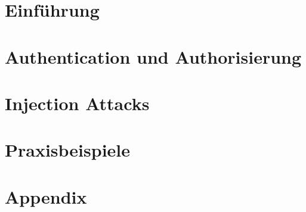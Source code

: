 \documentclass[11pt,fleqn]{book} %
\begin{document}



\pagestyle{empty} %

\tableofcontents %

\cleardoublepage %

\pagestyle{fancy} %



\mainmatter

\part{Einführung}











\part{Authentication und Authorisierung}









\part{Injection Attacks}







\appendix

\part {Praxisbeispiele}



\part{Appendix}




\end{document}
